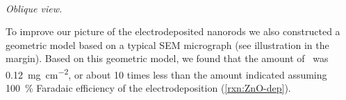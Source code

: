 \documentclass[draft,webedition,openright,titles,swedish,english]{LuaUUThesis}\usepackage[]{graphicx}\usepackage[]{xcolor}
\begin{document}
{
\scriptsize\itshape%
\\Oblique view.
}

To improve our picture of the electrodeposited  nanorods we also
constructed a geometric model based on a typical SEM micrograph
(see illustration in the margin).
Based on this geometric model, we found that the amount of \ZnO\ was
\qty{0.12}{\mg\per\square\cm}, or about \num{10} times less than the amount
indicated assuming \qty{100}{\percent} Faradaic efficiency of the electrodeposition
(\cref{rxn:ZnO-dep}).




%
\end{document}
